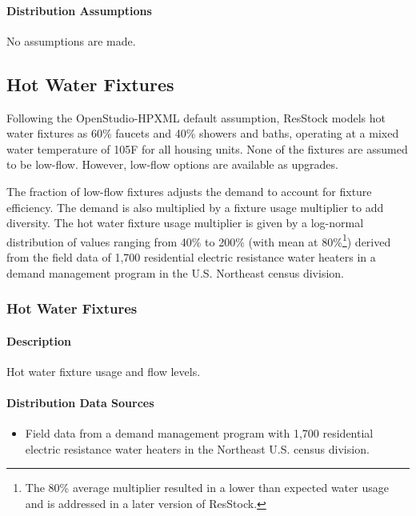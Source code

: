 \paragraph{Distribution Assumptions}
No assumptions are made.

\subsection{Hot Water Fixtures}
Following the OpenStudio-HPXML default assumption, ResStock models hot water fixtures as 60\% faucets and 40\% showers and baths, operating at a mixed water temperature of 105\degree F for all housing units. None of the fixtures are assumed to be low-flow. However, low-flow options are available as upgrades. 


The fraction of low-flow fixtures adjusts the demand to account for fixture efficiency. The demand is also multiplied by a fixture usage multiplier to add diversity. The hot water fixture usage multiplier is given by a log-normal distribution of values ranging from 40\% to 200\% (with mean at 80\%\footnote{The 80\% average multiplier resulted in a lower than expected water usage and is addressed in a later version of ResStock.}) derived from the field data of 1,700 residential electric resistance water heaters in a demand management program in the U.S. Northeast census division.

\subsubsection{Hot Water Fixtures}\label{hot_water_fixtures}
\paragraph{Description}
Hot water fixture usage and flow levels.

\paragraph{Distribution Data Sources}
\begin{itemize}
\item
  Field data from a demand management program with 1,700 residential
  electric resistance water heaters in the Northeast U.S. census division.
\end{itemize}

